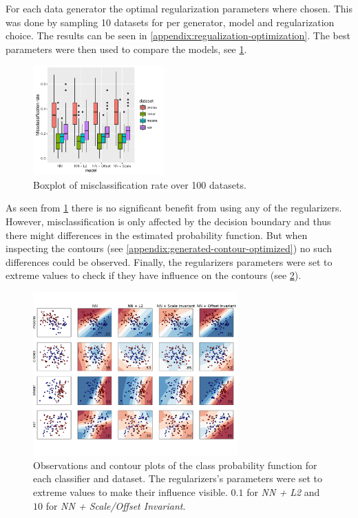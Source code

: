 For each data generator the optimal regularization parameters where chosen. This was done by sampling 10 datasets for per generator, model and regularization choice. The results can be seen in \cref{appendix:regualization-optimization}. The best parameters were then used to compare the models, see \cref{fig:2d_significant}.

\begin{figure}[h]
	\centering
	\includegraphics[width=0.45\textwidth]{plots/2d_significant}
	\caption{Boxplot of misclassification rate over 100 datasets.}
	\label{fig:2d_significant}
\end{figure}

As seen from \cref{fig:2d_significant} there is no significant benefit from using any of the regularizers. However, misclassification is only affected by the decision boundary and thus there might differences in the estimated probability function. But when inspecting the contours (see \cref{appendix:generated-contour-optimized}) no such differences could be observed. Finally, the regularizers parameters were set to extreme values to check if they have influence on the contours (see \cref{plt:generated-contour-extream}).

\begin{figure}[ht]
	\centering
	\includegraphics[width=0.7\textwidth, trim = 0 2.2cm 0 1.5cm, clip]{plots/2d_classifier-extream}
	\caption{Observations and contour plots of the class probability function for each classifier and dataset. The regularizers's parameters were set to extreme values to make their influence visible. $0.1$ for \textit{NN + L2} and $10$ for \textit{NN + Scale/Offset Invariant}.}
	\label{plt:generated-contour-extream}
\end{figure}
